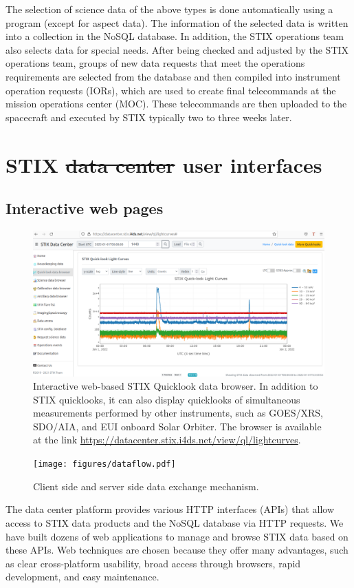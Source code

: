 \documentclass[referee]{aa} %
\providecommand{\DIFaddtex}[1]{{\protect\color{blue}\uwave{#1}}} %
\providecommand{\DIFdeltex}[1]{{\protect\color{red}\sout{#1}}}                      %
\providecommand{\DIFaddbegin}{} %
\providecommand{\DIFaddend}{} %
\providecommand{\DIFdelbegin}{} %
\providecommand{\DIFdelend}{} %
\providecommand{\DIFadd}[1]{\texorpdfstring{\DIFaddtex{#1}}{#1}} %
\providecommand{\DIFdel}[1]{\texorpdfstring{\DIFdeltex{#1}}{}} %
\newcommand{\DIFscaledelfig}{0.5}
\newlength{\DIFdelgraphicswidth} %
\newlength{\DIFdelgraphicsheight} %
\newcommand{\DIFaddincludegraphics}[2][]{{\color{blue}\fbox{\DIFOincludegraphics[#1]{#2}}}} %
\newcommand{\DIFdelincludegraphics}[2][]{%
\sbox{\DIFdelgraphicsbox}{\DIFOincludegraphics[#1]{#2}}%
\settoboxwidth{\DIFdelgraphicswidth}{\DIFdelgraphicsbox} %
\settoboxtotalheight{\DIFdelgraphicsheight}{\DIFdelgraphicsbox} %
\scalebox{\DIFscaledelfig}{%
\parbox[b]{\DIFdelgraphicswidth}{\usebox{\DIFdelgraphicsbox}\\[-\baselineskip] \rule{\DIFdelgraphicswidth}{0em}}\llap{\resizebox{\DIFdelgraphicswidth}{\DIFdelgraphicsheight}{%
\setlength{\unitlength}{\DIFdelgraphicswidth}%
\begin{picture}(1,1)%
\thicklines\linethickness{2pt} %
{\color[rgb]{1,0,0}\put(0,0){\framebox(1,1){}}}%
{\color[rgb]{1,0,0}\put(0,0){\line( 1,1){1}}}%
{\color[rgb]{1,0,0}\put(0,1){\line(1,-1){1}}}%
\end{picture}%
}\hspace*{3pt}}} %
} %
\DeclareRobustCommand{\DIFaddbegin}{\DIFOaddbegin \let\includegraphics\DIFaddincludegraphics} %
\DeclareRobustCommand{\DIFaddend}{\DIFOaddend \let\includegraphics\DIFOincludegraphics} %
\DeclareRobustCommand{\DIFdelbegin}{\DIFOdelbegin \let\includegraphics\DIFdelincludegraphics} %
\DeclareRobustCommand{\DIFdelend}{\DIFOaddend \let\includegraphics\DIFOincludegraphics} %
\begin{document}
The selection of science data of the above types is done automatically using a program (except for aspect data). The information of the selected data is written into a collection in the NoSQL database.  In addition, the STIX operations team also selects data for special 
needs.  After being checked and adjusted by the STIX operations team, groups of new data requests that meet the operations requirements are selected from the database and then compiled into instrument operation requests (IORs), which are used to create final telecommands at the mission operations center (MOC). 
These telecommands are then uploaded to the spacecraft and executed by STIX typically two to three weeks later. 

\section{STIX \DIFdelbegin \DIFdel{data center }\DIFdelend \DIFaddbegin \DIFadd{Data Center }\DIFaddend user interfaces}
\subsection{Interactive web pages}


\begin{figure}[ht]
  \centering
  \includegraphics[width=0.95\linewidth]{figures/data-browser.pdf}
  \caption{ 
    Interactive web-based STIX Quicklook data browser. 
    In addition to STIX quicklooks, it can also display quicklooks of simultaneous measurements  performed by other instruments, such as GOES/XRS, SDO/AIA, and EUI onboard Solar Orbiter.     The browser is available at the link \url{https://datacenter.stix.i4ds.net/view/ql/lightcurves}.}
  \label{fig:qlbrowser}
\end{figure}
\begin{figure}[ht]
  \centering
  \texttt{[image: figures/dataflow.pdf]}
  \caption{ 
   Client side and server side data exchange mechanism. 
  }
  \label{fig:interfaces}
\end{figure}
The data center platform provides various HTTP interfaces (APIs) that allow access to STIX data products
and the NoSQL database via HTTP requests. 
We have built dozens of web applications to manage and browse STIX data based on these APIs. 
Web techniques are chosen because they offer many advantages, such as clear cross-platform 
usability, broad access through browsers, rapid development, and easy maintenance.
\end{document}
